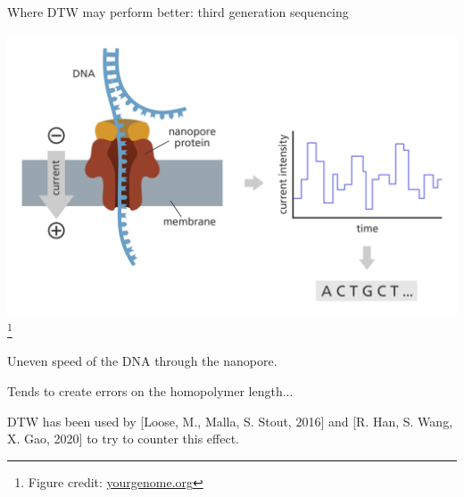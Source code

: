 \begin{frame}{Where DTW may perform better: third generation sequencing}
    \begin{center}
    \includegraphics[scale=0.25]{figures/ont-sequencing_yourgenome.png}\footnote{Figure credit: \href{https://www.yourgenome.org/facts/what-is-oxford-nanopore-technology-ont-sequencing/}{yourgenome.org}}
    \end{center}
    
    Uneven speed of the DNA through the nanopore.\pause
    
    Tends to create errors on the homopolymer length...\pause
    
    DTW has been used by [Loose, M., Malla, S. Stout, 2016] and [R. Han, S. Wang, X. Gao, 2020] to try to counter this effect.
    
\end{frame}

